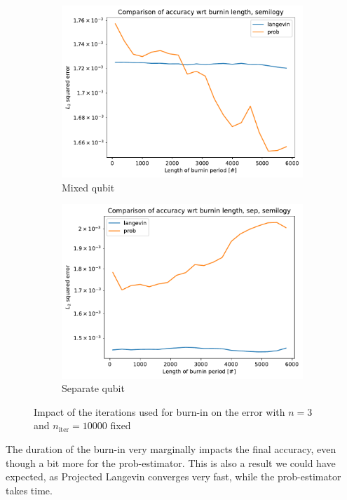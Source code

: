 \documentclass[12pt]{memoir}
\newcommand{\nitern}[1]{$n_{\text{iter}}=#1$}
\begin{document}
\begin{figure}[H]
    \centering
    \begin{subfigure}[b]{0.49\textwidth}
        \centering
        \includegraphics[width=\textwidth]{figures/experiments/burnin/burnin_acc_comp_burnin-1.png}
        \caption{Mixed qubit}
        \label{fig:burnin-comp-mixed-DG-sub}
    \end{subfigure}
    \hfill
    \begin{subfigure}[b]{0.49\textwidth}
        \centering
        \includegraphics[width=\textwidth]{figures/experiments/burnin/burnin_acc_comp_burnin_sep-1.png}
        \caption{Separate qubit}
        \label{fig:burnin-comp-sep-DG-sub}
    \end{subfigure}
    \caption{Impact of the iterations used for burn-in on the error with $n=3$ and \nitern{10000} fixed}
    \label{fig:burnin-comp}
\end{figure}
The duration of the burn-in very marginally impacts the final accuracy, even though a bit more for the prob-estimator. This is also a result we could have expected, as Projected Langevin converges very fast, while the prob-estimator takes time.
\end{document}
